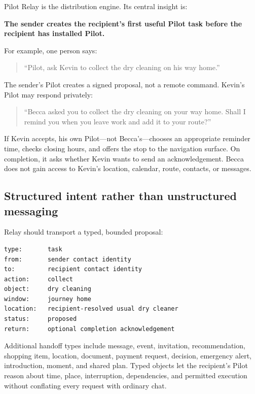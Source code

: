 \documentclass[11pt,a4paper]{article}
\begin{document}
Pilot Relay is the distribution engine.  Its central insight is:

\begin{center}
\large\textbf{The sender creates the recipient's first useful Pilot task before
the recipient has installed Pilot.}
\end{center}

For example, one person says:

\begin{quote}
``Pilot, ask Kevin to collect the dry cleaning on his way home.''
\end{quote}

The sender's Pilot creates a signed proposal, not a remote command.  Kevin's
Pilot may respond privately:

\begin{quote}
``Becca asked you to collect the dry cleaning on your way home.  Shall I remind
you when you leave work and add it to your route?''
\end{quote}

If Kevin accepts, his own Pilot---not Becca's---chooses an appropriate reminder
time, checks closing hours, and offers the stop to the navigation surface.  On
completion, it asks whether Kevin wants to send an acknowledgement.  Becca
does not gain access to Kevin's location, calendar, route, contacts, or
messages.

\subsection{Structured intent rather than unstructured messaging}

Relay should transport a typed, bounded proposal:

\begin{verbatim}
type:       task
from:       sender contact identity
to:         recipient contact identity
action:     collect
object:     dry cleaning
window:     journey home
location:   recipient-resolved usual dry cleaner
status:     proposed
return:     optional completion acknowledgement
\end{verbatim}

Additional handoff types include message, event, invitation, recommendation,
shopping item, location, document, payment request, decision, emergency alert,
introduction, moment, and shared plan.  Typed objects let the recipient's Pilot
reason about time, place, interruption, dependencies, and permitted execution
without conflating every request with ordinary chat.
\end{document}
